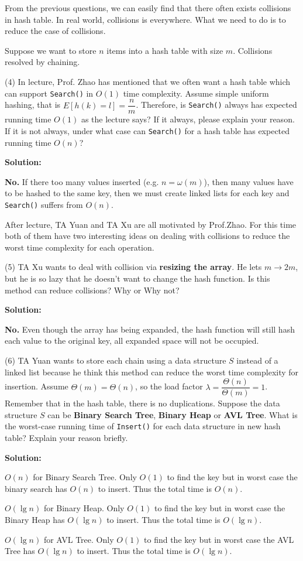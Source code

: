 \documentclass{article}
\begin{document}
From the previous questions, we can easily find that there often exists collisions in hash table. In real world, collisions is everywhere. What we need to do is to reduce the case of collisions.

Suppose we want to store $n$ items into a hash table with size $m$. Collisions resolved by chaining.

(4) In lecture, Prof. Zhao has mentioned that we often want a hash table which can support \texttt{Search()} in $O(1)$ time complexity. Assume simple uniform hashing, that is $E[h(k)=l]=\dfrac{n}{m}$. Therefore, is \texttt{Search()} always has expected running time $O(1)$ as the lecture says? If it always, please explain your reason. If it is not always, under what case can \texttt{Search()} for a hash table has expected running time $O(n)$?
\par\textbf{Solution:} 
\par\textbf{No.} If there too many values inserted (e.g. $n = \omega(m)$), then many values have to be hashed to the same key, then we must create linked lists for each key and \texttt{Search()} suffers from $O(n)$.
\vspace{6em}

After lecture, TA Yuan and TA Xu are all motivated by Prof.Zhao. For this time both of them have two interesting ideas on dealing with collisions to reduce the worst time complexity for each operation. 

(5) TA Xu wants to deal with collision via \textbf{resizing the array}. He lets $m\rightarrow 2m$, but he is so lazy that he doesn't want to change the hash function. Is this method can reduce collisions? Why or Why not?
\par\textbf{Solution:}
\par\textbf{No.} Even though the array has being expanded, the hash function will still hash each value to the original key, all expanded space will not be occupied.
\vspace{6em}

(6) TA Yuan wants to store each chain using a data structure $S$ instead of a linked list because he think this method can reduce the worst time complexity for insertion. Assume $\Theta(m) = \Theta(n)$, so the load factor $\lambda= \dfrac{\Theta(n)}{\Theta(m)} = 1$. Remember that in the hash table, there is no duplications. 
Suppose the data structure $S$ can be \textbf{Binary Search Tree}, \textbf{Binary Heap} or \textbf{AVL Tree}. What is the worst-case running time of \texttt{Insert()} for each data structure in new hash table? Explain your reason briefly.
\par\textbf{Solution:}
\par\boldmath$O(n)$\unboldmath \: for Binary Search Tree. Only $O(1)$ to find the key but in worst case the binary search has $O(n)$ to insert. Thus the total time is $O(n)$.
\par\boldmath$O(\lg n)$ \unboldmath \:for Binary Heap. Only $O(1)$ to find the key but in worst case the Binary Heap has $O(\lg n)$ to insert. Thus the total time is $O(\lg n)$.
\par\boldmath$O(\lg n)$ \unboldmath \:for AVL Tree. Only $O(1)$ to find the key but in worst case the AVL Tree has $O(\lg n)$ to insert. Thus the total time is $O(\lg n)$.
\end{document}
